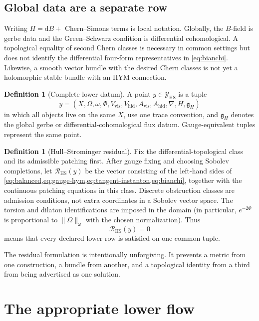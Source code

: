 \documentclass[11pt]{article}
\theoremstyle{definition}
\newtheorem{definition}[theorem]{Definition}
\theoremstyle{remark}
\newcommand{\dd}{\mathrm d}
\newcommand{\cR}{\mathcal R}
\newcommand{\cY}{\mathcal Y}
\begin{document}
\subsection{Global data are a separate row}

Writing \(H=\dd B+\) Chern--Simons terms is local notation.  Globally, the
\(B\)-field is gerbe data and the Green--Schwarz condition is differential
cohomological.  A topological equality of second Chern classes is necessary
in common settings but does not identify the differential four-form
representatives in \cref{eq:bianchi}.  Likewise, a smooth vector bundle with
the desired Chern classes is not yet a holomorphic stable bundle with an HYM
connection.

\begin{definition}[Complete lower datum]
\label{def:lower}
A point \(y\in\cY_{\mathrm{HS}}\) is a tuple
\[
y=(X,\Omega,\omega,\Phi,V_{\mathrm{vis}},V_{\mathrm{hid}},
A_{\mathrm{vis}},A_{\mathrm{hid}},\nabla,H,\mathfrak g_H)
\]
in which all objects live on the same \(X\), use one trace convention, and
\(\mathfrak g_H\) denotes the global gerbe or differential-cohomological flux
datum.  Gauge-equivalent tuples represent the same point.
\end{definition}

\begin{definition}[Hull--Strominger residual]
\label{def:residual}
Fix the differential-topological class and its admissible patching first.
After gauge fixing and choosing Sobolev completions, let
\(\cR_{\mathrm{HS}}(y)\) be the vector consisting of the left-hand sides of
\cref{eq:balanced,eq:gauge-hym,eq:tangent-instanton,eq:bianchi}, together
with the continuous patching equations in this class.  Discrete obstruction
classes are admission conditions, not extra coordinates in a Sobolev vector
space.  The torsion and dilaton identifications are imposed in the domain
(in particular, \(e^{-2\Phi}\) is proportional to \(\|\Omega\|_\omega\)
with the chosen normalization).  Thus
\[
\cR_{\mathrm{HS}}(y)=0
\]
means that every declared lower row is satisfied on one common tuple.
\end{definition}

The residual formulation is intentionally unforgiving.  It prevents a metric
from one construction, a bundle from another, and a topological identity from
a third from being advertised as one solution.

\section{The appropriate lower flow}
\label{sec:flow}
\end{document}
